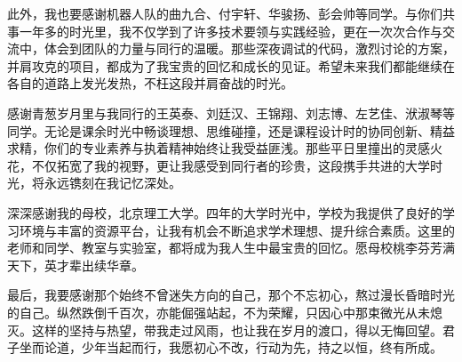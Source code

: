 \begin{acknowledgements}
此外，我也要感谢机器人队的曲九合、付宇轩、华骏扬、彭会帅等同学。与你们共事一年多的时光里，我不仅学到了许多技术要领与实践经验，更在一次次合作与交流中，体会到团队的力量与同行的温暖。那些深夜调试的代码，激烈讨论的方案，并肩攻克的项目，都成为了我宝贵的回忆和成长的见证。希望未来我们都能继续在各自的道路上发光发热，不枉这段并肩奋战的时光。

感谢青葱岁月里与我同行的王英泰、刘廷汉、王锦翔、刘志博、左艺佳、洑淑琴等同学。无论是课余时光中畅谈理想、思维碰撞，还是课程设计时的协同创新、精益求精，你们的专业素养与执着精神始终让我受益匪浅。那些平日里撞出的灵感火花，不仅拓宽了我的视野，更让我感受到同行者的珍贵，这段携手共进的大学时光，将永远镌刻在我记忆深处。

深深感谢我的母校，北京理工大学。四年的大学时光中，学校为我提供了良好的学习环境与丰富的资源平台，让我有机会不断追求学术理想、提升综合素质。这里的老师和同学、教室与实验室，都将成为我人生中最宝贵的回忆。愿母校桃李芬芳满天下，英才辈出续华章。

最后，我要感谢那个始终不曾迷失方向的自己，那个不忘初心，熬过漫长昏暗时光的自己。纵然跌倒千百次，亦能倔强站起，不为荣耀，只因心中那束微光从未熄灭。这样的坚持与热望，带我走过风雨，也让我在岁月的渡口，得以无悔回望。君子坐而论道，少年当起而行，我愿初心不改，行动为先，持之以恒，终有所成。




\end{acknowledgements}

